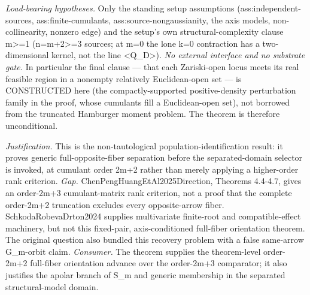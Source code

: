 \documentclass{article}
\begin{document}
\par\smallskip\noindent \textit{Load-bearing hypotheses.} Only the standing setup assumptions (ass:independent-sources, ass:finite-cumulants, ass:source-nongaussianity, the axis models, non-collinearity, nonzero edge) and the setup's own structural-complexity clause m>=1 (n=m+2>=3 sources; at m=0 the lone k=0 contraction has a two-dimensional kernel, not the line <Q_D>). \emph{No external interface and no substrate gate.} In particular the final clause --- that each Zariski-open locus meets its real feasible region in a nonempty relatively Euclidean-open set --- is CONSTRUCTED here (the compactly-supported positive-density perturbation family in the proof, whose cumulants fill a Euclidean-open set), not borrowed from the truncated Hamburger moment problem. The theorem is therefore unconditional.

\par\smallskip\noindent \textit{Justification.} This is the non-tautological population-identification result: it proves generic full-opposite-fiber separation before the separated-domain selector is invoked, at cumulant order 2m+2 rather than merely applying a higher-order rank criterion. \textit{Gap.} ChenPengHuangEtAl2025Direction, Theorems 4.4-4.7, gives an order-2m+3 cumulant-matrix rank criterion, not a proof that the complete order-2m+2 truncation excludes every opposite-arrow fiber. SchkodaRobevaDrton2024 supplies multivariate finite-root and compatible-effect machinery, but not this fixed-pair, axis-conditioned full-fiber orientation theorem. The original question also bundled this recovery problem with a false same-arrow G_m-orbit claim. \textit{Consumer.} The theorem supplies the theorem-level order-2m+2 full-fiber orientation advance over the order-2m+3 comparator; it also justifies the apolar branch of S_m and generic membership in the separated structural-model domain.
\end{document}
